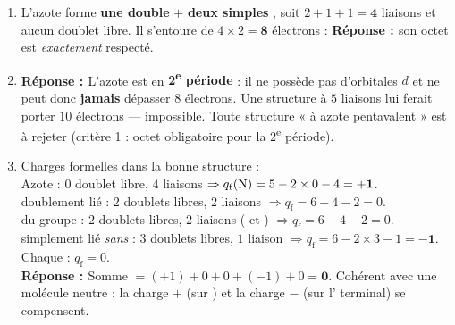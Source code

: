 \documentclass[11pt,a4paper]{article}
\newcommand{\rep}{\textbf{\textcolor{corcol}{Réponse : }}}
\begin{document}
\begin{cor}
\begin{enumerate}[label=\alph*),leftmargin=2em,itemsep=3pt]
  \item L'azote forme \textbf{une double}  $+$ \textbf{deux simples} , soit
        $2 + 1 + 1 = \mathbf{4}$ liaisons et aucun doublet libre. Il s'entoure de
        $4\times 2 = \mathbf{8}$ électrons : \rep son octet est \emph{exactement} respecté.
  \item \rep L'azote est en \textbf{2\textsuperscript{e} période} : il ne possède pas d'orbitales
        $d$ et ne peut donc \textbf{jamais} dépasser $8$ électrons. Une structure à $5$ liaisons lui
        ferait porter $10$ électrons — impossible. Toute structure « à azote pentavalent » est
        à rejeter (critère 1 : octet obligatoire pour la 2\textsuperscript{e} période).
  \item Charges formelles dans la bonne structure :\\
        Azote : $0$ doublet libre, $4$ liaisons $\Rightarrow
        q_{\mathrm{f}}(\ce{N}) = 5 - 2\times 0 - 4 = \mathbf{+1}$.\\
         doublement lié : $2$ doublets libres, $2$ liaisons $\Rightarrow q_{\mathrm{f}} = 6-4-2 = 0$.\\
         du groupe  : $2$ doublets libres, $2$ liaisons ( et )
        $\Rightarrow q_{\mathrm{f}} = 6-4-2 = 0$.\\
         simplement lié \emph{sans}  : $3$ doublets libres, $1$ liaison $\Rightarrow
        q_{\mathrm{f}} = 6 - 2\times 3 - 1 = \mathbf{-1}$.\\
        Chaque  : $q_{\mathrm{f}} = 0$.\\
        \rep Somme $= (+1) + 0 + 0 + (-1) + 0 = \mathbf{0}$. \checkmark\; Cohérent avec une molécule
        neutre : la charge $+$ (sur ) et la charge $-$ (sur l' terminal) se compensent.
\end{enumerate}
\end{cor}
\end{document}
